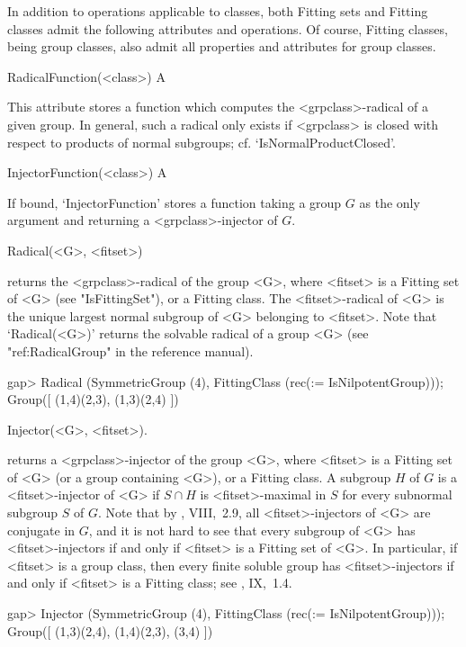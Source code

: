 
In addition to operations applicable to classes, both Fitting sets and
Fitting classes admit the following attributes and operations. Of course,
Fitting classes, being group classes, also admit all properties and
attributes for group classes.

\>RadicalFunction(<class>) A

This attribute stores a function which computes the <grpclass>-radical of a
given group. In general, such a radical only exists if <grpclass> is closed
with respect to products of normal subgroups; cf. `IsNormalProductClosed'.

\>InjectorFunction(<class>) A

If bound, `InjectorFunction' stores a function taking a group $G$ as the
only argument and returning a <grpclass>-injector of $G$.


\>Radical(<G>,  <fitset>)

%
%
returns the <grpclass>-radical of the group <G>, where
<fitset> is a Fitting set of <G> (see "IsFittingSet"), or a Fitting
class. The <fitset>-radical of <G> is the unique largest normal subgroup
of <G> belonging to <fitset>. Note that `Radical(<G>)' returns the solvable
radical of a group <G> (see "ref:RadicalGroup" in the {\GAP} reference
manual).

\beginexample
gap> Radical (SymmetricGroup (4), FittingClass (rec(\in := IsNilpotentGroup)));
Group([ (1,4)(2,3), (1,3)(2,4) ])
\endexample

\>Injector(<G>, <fitset>).

returns a <grpclass>-injector of the group <G>, where <fitset> is a
Fitting set of <G> (or a group containing <G>), or a Fitting class. A
subgroup $H$ of $G$ is a <fitset>-injector of <G> if $S \cap H$ is
<fitset>-maximal in $S$ for every subnormal subgroup $S$ of $G$. Note that by 
\cite{DH1992}, VIII,~2.9, all <fitset>-injectors of <G> are conjugate in $G$,
and it is not hard to see that every subgroup of <G> has <fitset>-injectors
if and only if <fitset> is a Fitting set of <G>. In particular, if <fitset>
is a group class, then every finite
soluble group has <fitset>-injectors if and only if <fitset> is a Fitting class;
see \cite{DH1992}, IX,~1.4.

\beginexample
gap> Injector (SymmetricGroup (4), FittingClass (rec(\in := IsNilpotentGroup)));
Group([ (1,3)(2,4), (1,4)(2,3), (3,4) ])
\endexample




